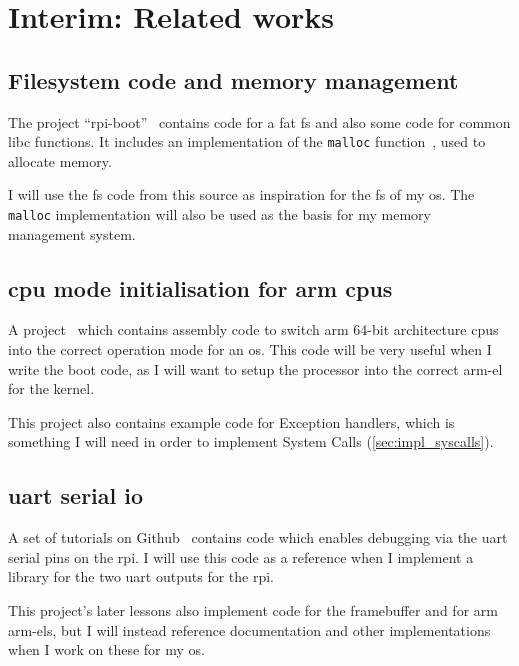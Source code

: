 \documentclass{article}
\begin{document}
\section{Interim: Related works}
\label{sec:related-works}
\begin{refsection}

\subsection{Filesystem code and memory management}
The project ``rpi-boot''~\cite{rpi-boot-gh} contains code for a \gls{fat}
\gls{fs} and also some code for common libc functions. It includes an
implementation of the \texttt{malloc} function~\cite{dlmalloc}, used to
allocate memory.

I will use the \gls{fs} code from this source as inspiration for the \gls{fs}
of my \gls{os}. The \texttt{malloc} implementation will also be used as the
basis for my memory management system.

\subsection{\texorpdfstring{\gls{cpu}}{CPU} mode initialisation for
\texorpdfstring{\gls{arm} \glspl{cpu}}{arm CPUs}}
A project~\cite{raspberry-pi-os-gh} which contains assembly code to switch
\gls{arm} 64-bit architecture \glspl{cpu} into the correct operation mode for
an \gls{os}. This code will be very useful when I write the boot code, as I
will want to setup the processor into the correct \gls{arm-el} for the kernel.

This project also contains example code for Exception handlers, which is
something I will need in order to implement System Calls
(\autoref{sec:impl_syscalls}).

\subsection{\texorpdfstring{\gls{uart}}{UART} serial
\texorpdfstring{\gls{io}}{IO}}
A set of tutorials on Github~\cite{raspi3-tutorial-gh} contains code which
enables debugging via the \gls{uart} serial pins on the \gls{rpi}. I will use
this code as a reference when I implement a library for the two \gls{uart}
outputs for the \gls{rpi}.

This project's later lessons also implement code for the framebuffer and for
\gls{arm} \glspl{arm-el}, but I will instead reference documentation and other
implementations when I work on these for my \gls{os}.


\end{refsection}
\end{document}
